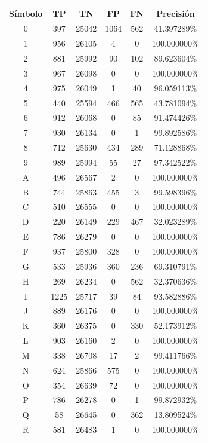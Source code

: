 \documentclass[a4paper, 11pt, oneside]{report}
\begin{document}
\begin{table}
\centering
\begin{tabular}{|c|c|c|c|c|c|}
	\hline
	Símbolo & TP & TN & FP & FN & Precisión \\ 
	\hline
	0 & 397 & 25042 & 1064 & 562 & 41.397289\% \\ 
	1 & 956 & 26105 & 4 & 0 & 100.000000\% \\ 
	2 & 881 & 25992 & 90 & 102 & 89.623604\% \\ 
	3 & 967 & 26098 & 0 & 0 & 100.000000\% \\ 
	4 & 975 & 26049 & 1 & 40 & 96.059113\% \\ 
	5 & 440 & 25594 & 466 & 565 & 43.781094\% \\ 
	6 & 912 & 26068 & 0 & 85 & 91.474426\% \\ 
	7 & 930 & 26134 & 0 & 1 & 99.892586\% \\ 
	8 & 712 & 25630 & 434 & 289 & 71.128868\% \\ 
	9 & 989 & 25994 & 55 & 27 & 97.342522\% \\ 
	A & 496 & 26567 & 2 & 0 & 100.000000\% \\ 
	B & 744 & 25863 & 455 & 3 & 99.598396\% \\ 
	C & 510 & 26555 & 0 & 0 & 100.000000\% \\ 
	D & 220 & 26149 & 229 & 467 & 32.023289\% \\ 
	E & 786 & 26279 & 0 & 0 & 100.000000\% \\ 
	F & 937 & 25800 & 328 & 0 & 100.000000\% \\ 
	G & 533 & 25936 & 360 & 236 & 69.310791\% \\ 
	H & 269 & 26234 & 0 & 562 & 32.370636\% \\ 
	I & 1225 & 25717 & 39 & 84 & 93.582886\% \\ 
	J & 889 & 26176 & 0 & 0 & 100.000000\% \\ 
	K & 360 & 26375 & 0 & 330 & 52.173912\% \\ 
	L & 903 & 26160 & 2 & 0 & 100.000000\% \\ 
	M & 338 & 26708 & 17 & 2 & 99.411766\% \\ 
	N & 624 & 25866 & 575 & 0 & 100.000000\% \\ 
	O & 354 & 26639 & 72 & 0 & 100.000000\% \\ 
	P & 786 & 26278 & 0 & 1 & 99.872932\% \\ 
	Q & 58 & 26645 & 0 & 362 & 13.809524\% \\ 
	R & 581 & 26483 & 1 & 0 & 100.000000\% \\ 

\end{tabular}
\end{table}
\end{document}
